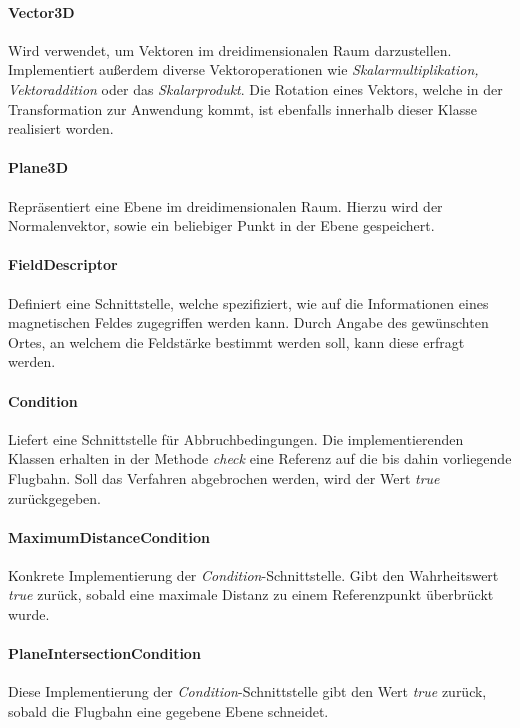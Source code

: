 \paragraph{Vector3D}
Wird verwendet, um Vektoren im dreidimensionalen Raum darzustellen. Implementiert au{\ss}erdem diverse Vektoroperationen wie
\textit{Skalarmultiplikation, Vektoraddition} oder das \textit{Skalarprodukt}. Die Rotation eines Vektors, welche in der
Transformation zur Anwendung kommt, ist ebenfalls innerhalb dieser Klasse realisiert worden.

\paragraph{Plane3D}
Repr\"asentiert eine Ebene im dreidimensionalen Raum. Hierzu wird der Normalenvektor, sowie ein beliebiger Punkt in der Ebene
gespeichert.

\paragraph{FieldDescriptor}
Definiert eine Schnittstelle, welche spezifiziert, wie auf die Informationen eines magnetischen Feldes zugegriffen werden kann.
Durch Angabe des gew\"unschten Ortes, an welchem die Feldst\"arke bestimmt werden soll, kann diese erfragt werden.

\paragraph{Condition}
Liefert eine Schnittstelle f\"ur Abbruchbedingungen. Die implementierenden Klassen erhalten in der Methode \textit{check} eine
Referenz auf die bis dahin vorliegende Flugbahn. Soll das Verfahren abgebrochen werden, wird der Wert \textit{true} zur\"uckgegeben.

\paragraph{MaximumDistanceCondition}
Konkrete Implementierung der \textit{Condition}-Schnittstelle. Gibt den Wahrheitswert \textit{true} zur\"uck, sobald eine maximale
Distanz zu einem Referenzpunkt \"uberbr\"uckt wurde.

\paragraph{PlaneIntersectionCondition}
Diese Implementierung der \textit{Condition}-Schnittstelle gibt den Wert \textit{true} zur\"uck, sobald die Flugbahn eine
gegebene Ebene schneidet.

